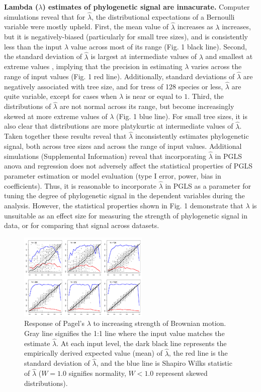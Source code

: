 \documentclass[9pt,twocolumn,twoside,lineno]{pnas-new}
\begin{document}
\textbf{Lambda (\(\lambda\)) estimates of phylogenetic signal are
innacurate.} Computer simulations reveal that for \(\hat{\lambda}\), the
distributional expectations of a Bernoulli variable were mostly upheld.
First, the mean value of \(\hat{\lambda}\) increases as \(\lambda\)
increases, but it is negatively-biased (particularly for small tree
sizes), and is consistently less than the input \(\lambda\) value across
most of its range (Fig. 1 black line). Second, the standard deviation of
\(\hat{\lambda}\) is largest at intermediate values of \(\lambda\) and
smallest at extreme values , implying that the precision in estimating
\(\lambda\) varies across the range of input values (Fig. 1 red line).
Additionally, standard deviations of \(\hat{\lambda}\) are negatively
associated with tree size, and for tress of 128 species or less,
\(\hat{\lambda}\) are quite variable, except for cases when \(\lambda\)
is near or equal to \(1\). Third, the distributions of \(\hat{\lambda}\)
are not normal across its range, but become increasingly skewed at more
extreme values of \(\lambda\) (Fig. 1 blue line). For small tree sizes,
it is also clear that distributions are more platykurtic at intermediate
values of \(\hat{\lambda}\). Taken together these results reveal that
\(\hat\lambda\) inconsistently estimates phylogenetic signal, both
across tree sizes and across the range of input values. Additional
simulations (Supplemental Information) reveal that incorporating
\(\hat\lambda\) in PGLS anova and regression does not adversely affect
the statistical properties of PGLS parameter estimation or model
evaluation (type I error, power, bias in coefficients). Thus, it is
reasonable to incorporate \(\hat\lambda\) in PGLS as a parameter for
tuning the degree of phylogenetic signal in the dependent variables
during the analysis. However, the statistical properties shown in Fig. 1
demonstrate that \(\lambda\) is unsuitable as an effect size for
measuring the strength of phylogenetic signal in data, or for comparing
that signal across datasets.

\begin{figure}
\centering
\includegraphics{fig.1.png}
\caption{Response of Pagel's \(\lambda\) to increasing strength of
Brownian motion. Gray line signifies the 1:1 line where the input value
matches the estimate \(\hat\lambda\). At each input level, the dark
black line represents the empirically derived expected value (mean) of
\(\hat\lambda\), the red line is the standard deviation of
\(\hat\lambda\), and the blue line is Shapiro Wilks statistic of
\(\hat\lambda\) (\(W=1.0\) signifies normality, \(W< 1.0\) represent
skewed distributions).{}}
\end{figure}
\end{document}

